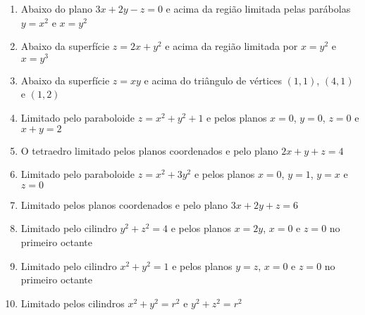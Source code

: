 	\begin{enumerate}[resume]
	
		\item Abaixo do plano $3x + 2y - z = 0$ e acima da região limitada pelas parábolas $y = x^2$ e $x = y^2$
		
		\item Abaixo da superfície $z = 2x + y^2$ e acima da região limitada por $x = y^2$ e $x = y^3$
		
		\item Abaixo da superfície $z = xy$ e acima do triângulo de vértices $(1,1)$, $(4,1)$ e $(1,2)$
		
		\item Limitado pelo paraboloide $z = x^2 + y^2 + 1$ e pelos planos $x = 0$, $y = 0$, $z = 0$ e $x + y = 2$
		
		\item O tetraedro limitado pelos planos coordenados e pelo plano $2x + y + z = 4$
		
		\item Limitado pelo paraboloide $z = x^2 + 3y^2$ e pelos planos $x = 0$, $y = 1$, $y = x$ e $z = 0$
		
		\item Limitado pelos planos coordenados e pelo plano $3x + 2y + z = 6$
		
		\item Limitado pelo cilindro $y^2 + z^2 = 4$ e pelos planos $x = 2y$, $x = 0$ e $z = 0$ no primeiro octante
		
		\item Limitado pelo cilindro $x^2 + y^2 = 1$ e pelos planos $y = z$, $x = 0$ e $z = 0$ no primeiro octante
		
		\item Limitado pelos cilindros \; $x^2 + y^2 = r^2$ \; e \; $y^2 + z^2 = r^2$
	
	\end{enumerate}
			
	\vspace{5mm}	
	
	


